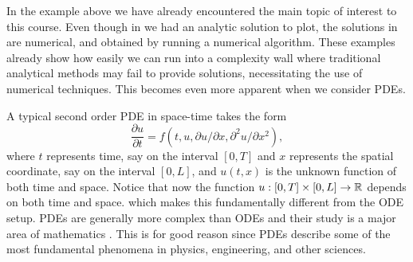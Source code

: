 In the example above we have already encountered the main topic 
of interest to this course. Even though in 
we had an analytic solution to plot, the solutions in 
 are numerical, and 
obtained by running a numerical algorithm. These examples 
already show how easily we can run into a complexity wall where 
traditional analytical methods may fail to provide solutions, 
necessitating the use of numerical techniques. This becomes 
even more apparent when we consider PDEs. 

A typical second order PDE in space-time takes the form 
\begin{equation}\label{eq:second_order_pde}
    \frac{\partial u}{\partial t} = 
    f(t, u, \partial u/\partial x, \partial^2 u/\partial x^2),
\end{equation}
where $t$ represents time, say on the interval $[0,T]$ and 
$x$ represents the spatial coordinate, say on the interval $[0,L]$, and $u(t,x)$ is the unknown function of both time and space. Notice that now 
the function $u: [0,T] \times [0,L] \to \mathbb{R}$  depends on both time and space.
which makes this fundamentally different from the ODE setup. 
PDEs are generally more complex than ODEs and their study is a 
major area of mathematics \cite{evans2010partial}. This is for 
good reason since PDEs describe some of the most 
fundamental phenomena in physics, engineering, and other sciences.


